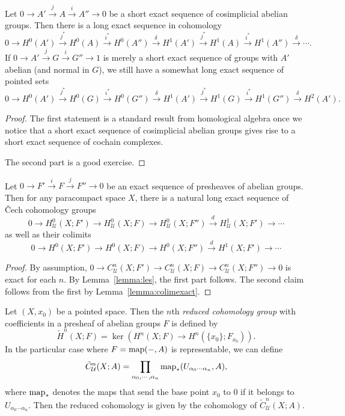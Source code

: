 \documentclass[a4paper,openany]{scrbook}
\begin{document}
\begin{lemma}\label{lemma:les}
Let $0 \to A' \xrightarrow{j} A \xrightarrow{i} A'' \to 0$ be a short exact sequence of cosimplicial abelian groups. Then there is a long exact sequence in cohomology
\[
0 \to H^0(A') \xrightarrow{j^*} H^0(A) \xrightarrow{i^*} H^0(A'') \xrightarrow{\delta} H^1(A') \xrightarrow{j^*} H^1(A) \xrightarrow{i^*} H^1(A'') \xrightarrow{\delta} \cdots.
\]
If $0 \to A' \xrightarrow{j} G \xrightarrow{i} G'' \to 1$ is merely a short exact sequence of groups with $A'$ abelian (and normal in $G$), we still have a somewhat long exact sequence of pointed sets
\[
0 \to H^0(A') \xrightarrow{j^*} H^0(G) \xrightarrow{i^*} H^0(G'') \xrightarrow{\delta} H^1(A') \xrightarrow{j^*} H^1(G) \xrightarrow{i^*} H^1(G'') \xrightarrow{\delta} H^2(A').
\]
\end{lemma}
\begin{proof}
The first statement is a standard result from homological algebra once we notice that a short exact sequence of cosimplicial abelian groups gives rise to a short exact sequence of cochain complexes.

The second part is a good exercise.
\end{proof}

\begin{corollary} \label{cor:lesfromsesofpresheaves}
Let $0 \to F' \xrightarrow{i} F \xrightarrow{j} F'' \to 0$ be an exact sequence of presheaves of abelian groups.
Then for any paracompact space $X$, there is a natural long exact sequence of Čech cohomology groups
\[
0 \to H^0_{\mathcal U}(X;F') \to H^0_{\mathcal U}(X;F) \to H^0_{\mathcal U}(X;F'') \xrightarrow{d} H^1_{\mathcal U}(X;F') \to \cdots
\]
as well as their colimits
\[
0 \to H^0(X;F') \to H^0(X;F) \to H^0(X;F'') \xrightarrow{d} H^1(X;F') \to \cdots
\]
\end{corollary}
\begin{proof}
By assumption, $0 \to C^n_{\mathcal U}(X;F') \to C^n_{\mathcal U}(X;F) \to C^n_{\mathcal U}(X;F'') \to 0$ is exact for each $n$. By Lemma~\ref{lemma:les}, the first part follows. The second claim follows from the first by Lemma~\ref{lemma:colimexact}.
\end{proof}


\begin{defn}
Let $(X,x_0)$ be a pointed space. Then the $n$th \emph{reduced cohomology group} with coefficients in a presheaf of abelian groups $F$ is defined by
\[
\tilde H^n(X;F) = \ker(H^n(X;F) \to H^n(\{x_0\};F_{x_0})).
\]
In the particular case where $F=\operatorname{map}(-,A)$ is representable, we can define
\[
\tilde C^n_{\mathcal U}(X;A) = \prod_{\alpha_0,\cdots,\alpha_n} \operatorname{map}_*(U_{\alpha_0\cdots\alpha_n},A),
\]
where $\operatorname{map}_*$ denotes the maps that send the base point $x_0$ to $0$ if it belongs to $U_{\alpha_0\cdots\alpha_n}$. Then the reduced cohomology is given by the cohomology of $\tilde C^n_{\mathcal U}(X;A)$.
\end{defn}
\end{document}
